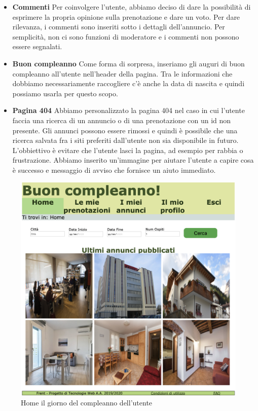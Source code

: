 \documentclass[1_relazione.tex]{subfiles}
\begin{document}
    \begin{itemize}
        \item \textbf{Commenti} Per coinvolgere l'utente, abbiamo deciso di dare la possibilit\`{a} di esprimere la propria opinione sulla prenotazione e dare un voto. Per dare rilevanza, i commenti sono inseriti sotto i dettagli dell'annuncio. Per semplicit\`{a}, non ci sono funzioni di moderatore e i commenti non possono essere segnalati.

        \item \textbf{Buon compleanno} Come forma di sorpresa, inseriamo gli auguri di buon compleanno all'utente nell'header della pagina. Tra le informazioni che dobbiamo necessariamente raccogliere c'è anche la data di nascita e quindi possiamo usarla per questo scopo.

        \item \textbf{Pagina 404} Abbiamo personalizzato la pagina 404 nel caso in cui l'utente faccia una ricerca di un annuncio o di una prenotazione con un id non presente. Gli annunci possono essere rimossi e quindi è possibile che una ricerca salvata fra i siti preferiti dall'utente non sia disponibile in futuro. L'obbiettivo è evitare che l'utente lasci la pagina, ad esempio per rabbia o frustrazione. Abbiamo inserito un'immagine per aiutare l'utente a capire cosa è successo e messaggio di avviso che fornisce un aiuto immediato.

    \end{itemize}
    \begin{figure}[h!]
        \centering
        \includegraphics[scale=0.3]{immagini/buonCompleanno.png}
        \caption{Home il giorno del compleanno dell'utente}
    \end{figure}
\end{document}
